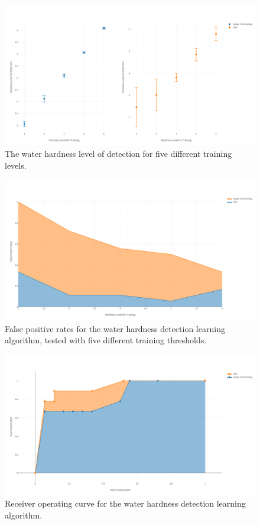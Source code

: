 \begin{figure}[t]
\centering
\includegraphics[width=\textwidth]{water/hardnessresults.png}
\caption{The water hardness level of detection for five different training levels.}
\label{fig:hardnessresults}
\end{figure}


\begin{figure}[t]
\centering
\includegraphics[width=\textwidth]{water/hardnessfalsepositives.png}
\caption{False positive rates for the water hardness detection learning algorithm, tested with five different training thresholds.}
\label{fig:falsepositives}
\end{figure}

\begin{figure}[t]
\centering
\includegraphics[width=\textwidth]{water/hardnessroc.png}
\caption{Receiver operating curve for the water hardness detection learning algorithm.}
\label{fig:roc}
\end{figure}


